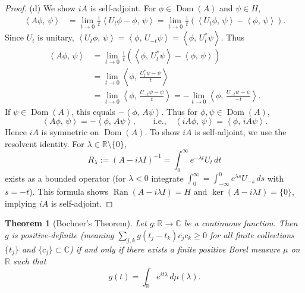 \documentclass[11pt]{article}
\newtheorem{theorem}{Theorem}[section]
\theoremstyle{definition}
\theoremstyle{remark}
\newcommand{\C}{\mathbb{C}}
\newcommand{\R}{\mathbb{R}}
\newcommand{\1}{\mathbbm{1}}
\newcommand{\ip}[2]{\left\langle #1,\,#2 \right\rangle}
\DeclareMathOperator{\Dom}{Dom}
\DeclareMathOperator{\Ran}{Ran}
\begin{document}
\begin{proof}
(d) We show $iA$ is self-adjoint. For $\phi\in\Dom(A)$ and $\psi\in H$,
\begin{align*}
\ip{A\phi}{\psi}&=\lim_{t\to 0}\frac{1}{t}\ip{U_t\phi-\phi}{\psi}=\lim_{t\to 0}\frac{1}{t}(\ip{U_t\phi}{\psi}-\ip{\phi}{\psi}).
\end{align*}
Since $U_t$ is unitary, $\ip{U_t\phi}{\psi}=\ip{\phi}{U_{-t}\psi}=\ip{\phi}{U_t^*\psi}$. Thus
\begin{align*}
\ip{A\phi}{\psi}&=\lim_{t\to 0}\frac{1}{t}(\ip{\phi}{U_t^*\psi}-\ip{\phi}{\psi})\\
&=\lim_{t\to 0}\ip{\phi}{\frac{U_t^*\psi-\psi}{t}}\\
&=\lim_{t\to 0}\ip{\phi}{\frac{U_{-t}\psi-\psi}{t}}=-\lim_{t\to 0}\ip{\phi}{\frac{U_{-t}\psi-\psi}{-t}}.
\end{align*}
If $\psi\in\Dom(A)$, this equals $-\ip{\phi}{A\psi}$. Thus for $\phi,\psi\in\Dom(A)$,
\[
\ip{A\phi}{\psi}=-\ip{\phi}{A\psi},\qquad\text{i.e.,}\quad\ip{iA\phi}{\psi}=\ip{\phi}{iA\psi}.
\]
Hence $iA$ is symmetric on $\Dom(A)$. To show $iA$ is self-adjoint, we use the resolvent identity. For $\lambda\in\R\setminus\{0\}$,
\[
R_{\lambda}:=(A-i\lambda I)^{-1}=\int_0^\infty e^{-\lambda t}U_t\,dt
\]
exists as a bounded operator (for $\lambda<0$ integrate $\int_0^\infty=\int_{-\infty}^0 e^{\lambda s}U_{-s}\,ds$ with $s=-t$). This formula shows $\Ran(A-i\lambda I)=H$ and $\ker(A-i\lambda I)=\{0\}$, implying $iA$ is self-adjoint.
\end{proof}

\begin{theorem}[Bochner's Theorem]\label{thm:bochner}
Let $g:\R\to\C$ be a continuous function. Then $g$ is positive-definite (meaning $\sum_{j,k}g(t_j-t_k)\overline{c_j}c_k\geq 0$ for all finite collections $\{t_j\}$ and $\{c_j\}\subset\C$) if and only if there exists a finite positive Borel measure $\mu$ on $\R$ such that
\[
g(t)=\int_{\R}e^{it\lambda}\,d\mu(\lambda).
\]
\end{theorem}
\end{document}
